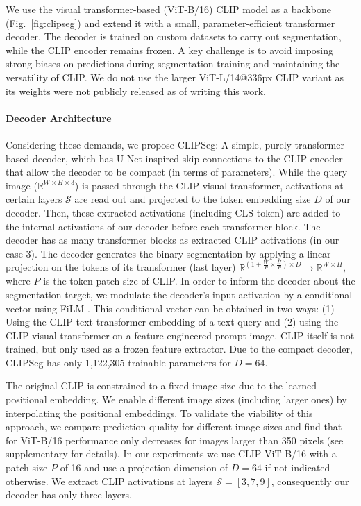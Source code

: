 \documentclass[10pt,twocolumn,letterpaper]{article}
\begin{document}
We use the visual transformer-based (ViT-B/16) CLIP \cite{radford20} model as a backbone (Fig.~\ref{fig:clipseg}) and extend it with a small, parameter-efficient transformer decoder. The decoder is trained on custom datasets to carry out segmentation, while the CLIP encoder remains frozen.
A key challenge is to avoid imposing strong biases on predictions during segmentation training and maintaining the versatility of CLIP. We do not use the larger ViT-L/14@336px CLIP variant as its weights were not publicly released as of writing this work.


\def\v{\mathbf{v}}
\def\t{\mathbf{t}}
\def\y{\mathbf{y}}
\def\q{\mathbf{q}}
\def\s{\mathbf{s}}

\paragraph{Decoder Architecture}



Considering these demands, we propose CLIPSeg: A simple, purely-transformer based decoder, which has U-Net-inspired skip connections to the CLIP encoder that allow the decoder to be compact (in terms of parameters). While the query image ($\mathbb{R}^{W \times H \times 3}$) is passed through the CLIP visual transformer, activations at certain layers $\mathcal{S}$ are read out and projected to the token embedding size $D$ of our decoder. 
Then, these extracted activations (including CLS token) are added to the internal activations of our decoder before each transformer block. The decoder has as many transformer blocks as extracted CLIP activations (in our case 3).
The decoder generates the binary segmentation by applying a linear projection on the tokens of its transformer (last layer) $\mathbb{R}^{(1 + \frac{W}{P} \times \frac{H}{P}) \times D} \mapsto  \mathbb{R}^{W \times H}$, where $P$ is the token patch size of CLIP.
In order to inform the decoder about the segmentation target, we modulate the decoder's input activation by a conditional vector using FiLM \cite{dumoulin18}. 
This conditional vector can be obtained in two ways: (1) Using the CLIP text-transformer embedding of a text query and (2) using the CLIP visual transformer on a feature engineered prompt image. 
CLIP itself is not trained, but only used as a frozen feature extractor. Due to the compact decoder, CLIPSeg has only 1,122,305 trainable parameters for $D=64$.

The original CLIP is constrained to a fixed image size due to the learned positional embedding. We enable different image sizes (including larger ones) by interpolating the positional embeddings. To validate the viability of this approach, we compare prediction quality for different image sizes and find that for ViT-B/16 performance only decreases for images larger than 350 pixels (see supplementary for details).
In our experiments we use CLIP ViT-B/16 with a patch size $P$ of 16 and use a projection dimension of $D = 64$ if not indicated otherwise. We extract CLIP activations at layers $\mathcal{S} = [3,7,9]$, consequently our decoder has only three layers.
\end{document}
